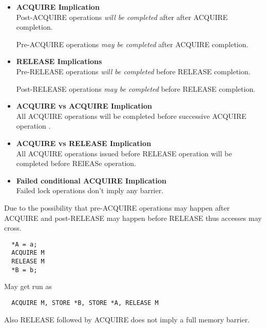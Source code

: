 \documentclass{article}
\begin{document}
\begin{itemize}
  
\item \textbf{ACQUIRE Implication} \\

  Post-ACQUIRE operations \emph{will be completed} after after ACQUIRE
  completion.

  Pre-ACQUIRE operations \emph{may be completed} after ACQUIRE
  completion.
  
\item \textbf{RELEASE Implications} \\

  Pre-RELEASE operations \emph{will be completed} before RELEASE
  completion.

  Post-RELEASE operations \emph{may be completed} before RELEASE
  completion.

\item \textbf{ACQUIRE vs ACQUIRE Implication} \\

  All ACQUIRE operations will be completed before successive ACQUIRE
  operation .

\item \textbf{ACQUIRE vs RELEASE Implication} \\

  All ACQUIRE operations issued before RELEASE operation will be
  completed before RElEASe operation.

\item \textbf{Failed conditional ACQUIRE Implication} \\

  Failed lock operations don't imply any barrier.
  
\end{itemize}

Due to the possibility that pre-ACQUIRE operations may happen after
ACQUIRE and post-RELEASE may happen before RELEASE thus accesses may
cross.

\begin{lstlisting}
  *A = a;
  ACQUIRE M
  RELEASE M
  *B = b;
\end{lstlisting}

May get run as

\begin{lstlisting}
  ACQUIRE M, STORE *B, STORE *A, RELEASE M
\end{lstlisting}

Also RELEASE followed by ACQUIRE does not imply a full memory barrier.
\end{document}
